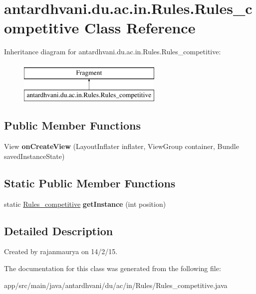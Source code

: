 \hypertarget{classantardhvani_1_1du_1_1ac_1_1in_1_1_rules_1_1_rules__competitive}{}\section{antardhvani.\+du.\+ac.\+in.\+Rules.\+Rules\+\_\+competitive Class Reference}
\label{classantardhvani_1_1du_1_1ac_1_1in_1_1_rules_1_1_rules__competitive}
Inheritance diagram for antardhvani.\+du.\+ac.\+in.\+Rules.\+Rules\+\_\+competitive\+:\begin{figure}[H]
\begin{center}
\leavevmode
\includegraphics[height=2.000000cm]{classantardhvani_1_1du_1_1ac_1_1in_1_1_rules_1_1_rules__competitive}
\end{center}
\end{figure}
\subsection*{Public Member Functions}
\begin{DoxyCompactItemize}
\item 
\hypertarget{classantardhvani_1_1du_1_1ac_1_1in_1_1_rules_1_1_rules__competitive_ae2a54ef3929d8b24af9abc685aceceb3}{}View {\bfseries on\+Create\+View} (Layout\+Inflater inflater, View\+Group container, Bundle saved\+Instance\+State)\label{classantardhvani_1_1du_1_1ac_1_1in_1_1_rules_1_1_rules__competitive_ae2a54ef3929d8b24af9abc685aceceb3}

\end{DoxyCompactItemize}
\subsection*{Static Public Member Functions}
\begin{DoxyCompactItemize}
\item 
\hypertarget{classantardhvani_1_1du_1_1ac_1_1in_1_1_rules_1_1_rules__competitive_ad07a0b7888f02ed37422db065a4f9abd}{}static \hyperlink{classantardhvani_1_1du_1_1ac_1_1in_1_1_rules_1_1_rules__competitive}{Rules\+\_\+competitive} {\bfseries get\+Instance} (int position)\label{classantardhvani_1_1du_1_1ac_1_1in_1_1_rules_1_1_rules__competitive_ad07a0b7888f02ed37422db065a4f9abd}

\end{DoxyCompactItemize}


\subsection{Detailed Description}
Created by rajanmaurya on 14/2/15. 

The documentation for this class was generated from the following file\+:\begin{DoxyCompactItemize}
\item 
app/src/main/java/antardhvani/du/ac/in/\+Rules/Rules\+\_\+competitive.\+java\end{DoxyCompactItemize}
